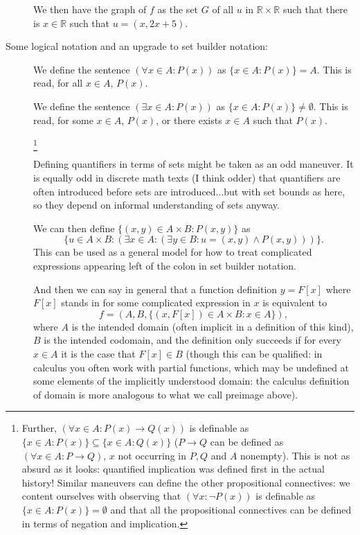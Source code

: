 \documentclass[12pt]{article}
\begin{document}
\begin{description}
We then have the graph of $f$ as the set $G$ of all $u$ in $\mathbb R \times \mathbb R$ such that there is $x \in \mathbb R$ such that $u = (x,2x+5)$.

\item[Some logical notation and an upgrade to set builder notation:]

We define the sentence $(\forall x \in A:P(x))$ as $\{x \in A:P(x)\} = A$.  This is read, for all $x \in A$, $P(x)$.

We define the sentence $(\exists x \in A:P(x))$ as $\{x \in A:P(x)\} \neq \emptyset$.  This is read, for some $x \in A$, $P(x)$, or there exists $x \in A$ such that $P(x)$.

\footnote{Further, $(\forall x \in A:P(x) \rightarrow Q(x))$ is definable as $\{x \in A:P(x)\} \subseteq \{x \in A:Q(x)\}$
($P \rightarrow Q$ can be defined as $(\forall x \in A:P \rightarrow Q)$, $x$ not occurring in $P,Q$ and $A$ nonempty).  This is not as  absurd as it looks:  quantified implication was defined first in the actual history!  Similar maneuvers can define the other propositional connectives:  we content ourselves with observing that $(\forall x:\neg P(x))$ is definable as $\{x \in A:P(x)\} = \emptyset$ and that all the propositional connectives can be defined in terms of negation and implication.}

Defining quantifiers in terms of sets might be taken as an odd maneuver.  It is equally odd in discrete math texts (I think odder) that quantifiers are often introduced before sets are introduced...but with set bounds as here, so they depend on informal understanding of sets anyway.

We can then define $\{(x,y) \in A \times B:P(x,y)\}$ as $$\{u \in A \times B:(\exists x \in A:(\exists y \in B:u=(x,y) \wedge P(x,y)))\}.$$ This can be used as a general model for how to treat complicated expressions appearing left of the colon in set builder notation.

And then we can say in general that a function definition $y = F[x]$ where $F[x]$ stands in for some complicated expression in $x$ is equivalent to $$f=(A,B,\{(x,F[x]) \in A \times B:x\in A\}),$$  where $A$ is the intended domain (often implicit in a definition of this kind), $B$ is the intended codomain, and the definition only succeeds if for every $x \in A$ it is the case that $F[x] \in B$ (though this can be qualified:  in calculus you often work with partial functions, which may be undefined at some elements of the implicitly understood domain:  the calculus definition of domain is more analogous to what we call preimage above).


\end{description}
\end{document}
